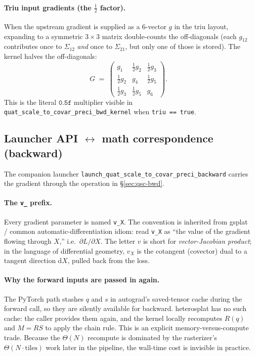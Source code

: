 \documentclass[11pt]{article}
\begin{document}
\paragraph{Triu input gradients (the $\tfrac{1}{2}$ factor).}
When the upstream gradient is supplied as a $6$-vector $g$ in the
triu layout, expanding to a symmetric $3 \times 3$ matrix
double-counts the off-diagonals (each $g_{12}$ contributes once to
$\Sigma_{12}$ \emph{and} once to $\Sigma_{21}$, but only one of
those is stored). The kernel halves the off-diagonals:
\begin{equation}
  G \;=\; \begin{pmatrix}
    g_{1} & \tfrac{1}{2} g_{2} & \tfrac{1}{2} g_{3} \\
    \tfrac{1}{2} g_{2} & g_{4} & \tfrac{1}{2} g_{5} \\
    \tfrac{1}{2} g_{3} & \tfrac{1}{2} g_{5} & g_{6}
  \end{pmatrix}.
  \label{eq:triu-half}
\end{equation}
This is the literal $\texttt{0.5f}$ multiplier visible in
\texttt{quat\_scale\_to\_covar\_preci\_bwd\_kernel} when
\texttt{triu == true}.

\subsection{Launcher API \texorpdfstring{$\leftrightarrow$}{<->} math correspondence (backward)}
\label{sec:qsc-bwd-api}

The companion launcher
\texttt{launch\_quat\_scale\_to\_covar\_preci\_backward} carries the
gradient through the operation in §\ref{sec:qsc-bwd}.

\paragraph{The \texttt{v\_} prefix.}
Every gradient parameter is named \texttt{v\_X}. The convention is
inherited from gsplat / common automatic-differentiation idiom: read
\texttt{v\_X} as ``the value of the gradient flowing through $X$,''
i.e.\ $\partial L / \partial X$. The letter $v$ is short for
\emph{vector-Jacobian product}; in the language of differential
geometry, $v_X$ is the cotangent (covector) dual to a tangent
direction $\mathrm{d}X$, pulled back from the loss.

\paragraph{Why the forward inputs are passed in again.}
The PyTorch path stashes $q$ and $s$ in autograd's saved-tensor cache
during the forward call, so they are silently available for backward.
heterosplat has no such cache: the caller provides them again, and the
kernel locally recomputes $R(q)$ and $M = R S$ to apply the chain rule.
This is an explicit memory-versus-compute trade. Because the
$\Theta(N)$ recompute is dominated by the rasterizer's
$\Theta(N \cdot \text{tiles})$ work later in the pipeline, the wall-time
cost is invisible in practice.
\end{document}
